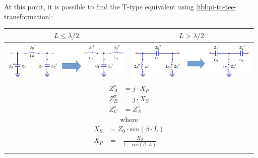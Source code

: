 \noindent At this point, it is possible to find the T-type equivalent using \ref{tbl:pi-to-tee-transformation}:

\begin{table}[H]
  \centering
  \begin{tabular}{ | c | c | }
    \hline
    $L \leq \lambda/2$ & $L > \lambda/2$\\ \hline
    \begin{minipage}{.4\textwidth}
      \includegraphics[width=\linewidth]{TL-circuit-equivalent-LP-Pi-Tee}
    \end{minipage}
    &
    \begin{minipage}{.4\textwidth}
      \includegraphics[width=\linewidth]{TL-circuit-equivalent-HP-Pi-Tee}
    \end{minipage}
\\ \hline
    \multicolumn{2}{|c|}{
    \begin{minipage}{.4\textwidth}
         { \begin{align}
              Z_A^{\pi} &= j \cdot X_P\\
              Z_B^{\pi} &= j \cdot X_S \\
              Z_C^{\pi} &= Z_A^{\pi} 
         \end{align}
        \noindent where
        \begin{align}
              X_S &= Z_0 \cdot sin(\beta \cdot L)\\
              X_P &= -\frac{X_S}{1 - cos(\beta \cdot L)}
         \end{align}
       }\end{minipage}}
\\ \hline
    \begin{minipage}{.4\textwidth}

\end{minipage}
\end{tabular}
\end{table}
